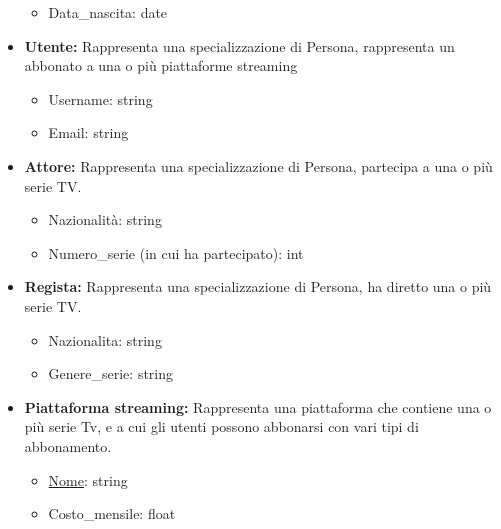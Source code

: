 \documentclass[12pt,a4paper]{article}
\begin{document}
\begin{itemize}
\begin{itemize}
        \item Data\_nascita: date
    \end{itemize}
    \item \textbf{Utente:} Rappresenta una specializzazione di Persona, rappresenta un abbonato a una o più piattaforme streaming
    \begin{itemize}
        \item Username: string
        \item Email: string
    \end{itemize}
    \item \textbf{Attore:} Rappresenta una specializzazione di Persona, partecipa a una o più serie TV.
    \begin{itemize}
        \item Nazionalità: string
        \item Numero\_serie (in cui ha partecipato): int
    \end{itemize}
    \item \textbf{Regista:} Rappresenta una specializzazione di Persona, ha diretto una o più serie TV.
    \begin{itemize}
        \item Nazionalita: string
        \item Genere\_serie: string
    \end{itemize}
    \item \textbf{Piattaforma streaming:} Rappresenta una piattaforma che contiene una o più serie Tv, e a cui gli utenti possono abbonarsi con vari tipi di abbonamento.
    \begin{itemize}
        \item \underline{Nome}: string
        \item Costo\_mensile: float
    \end{itemize}
\end{itemize}
\end{document}
